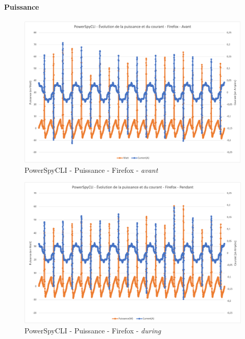 \documentclass[12pt, a4paper]{report}
\begin{document}
\paragraph{
\textbf{Puissance}}
\begin{figure}[H]
    \includegraphics[width=1\linewidth]{res//graph/PowerSpyCLI/Puissance_ff_avant.png}
    \caption{PowerSpyCLI - Puissance - Firefox - \textit{avant}}
    \label{fig:pscli_power_ff_after}
\end{figure}
\begin{figure}[H]
    \includegraphics[width=1\linewidth]{res//graph/PowerSpyCLI/Puissance_ff_pendant.png}
    \caption{PowerSpyCLI - Puissance - Firefox - \textit{during}}
    \label{fig:pscli_power_ff_after}
\end{figure}
\end{document}

